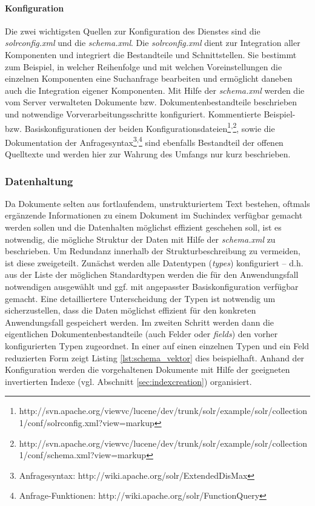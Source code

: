 \paragraph{Konfiguration} Die zwei wichtigsten Quellen zur Konfiguration des Dienstes sind die \textit{solrconfig.xml} und die \textit{schema.xml}. Die \textit{solrconfig.xml} dient zur Integration aller Komponenten und integriert die Bestandteile und Schnittstellen. Sie bestimmt zum Beispiel, in welcher Reihenfolge und mit welchen Voreinstellungen die einzelnen Komponenten eine Suchanfrage bearbeiten und ermöglicht daneben auch die Integration eigener Komponenten. Mit Hilfe der  \textit{schema.xml} werden die vom Server verwalteten Dokumente bzw. Dokumentenbestandteile beschrieben und notwendige Vorverarbeitungsschritte konfiguriert. Kommentierte Beispiel- bzw. Basiskonfigurationen der beiden Konfigurationsdateien\footnote{\tiny{http://svn.apache.org/viewvc/lucene/dev/trunk/solr/example/solr/collection1/conf/solrconfig.xml?view=markup}}\textsuperscript{,}\footnote{\tiny{http://svn.apache.org/viewvc/lucene/dev/trunk/solr/example/solr/collection1/conf/schema.xml?view=markup}}, sowie die Dokumentation der Anfragesyntax\footnote{\tiny{Anfragesyntax: http://wiki.apache.org/solr/ExtendedDisMax}}\textsuperscript{,}\footnote{\tiny{Anfrage-Funktionen: http://wiki.apache.org/solr/FunctionQuery}} sind ebenfalls Bestandteil der offenen Quelltexte und werden hier zur Wahrung des Umfangs nur kurz beschrieben.

\subsubsection{Datenhaltung}\label{sec:solrshards}

Da Dokumente selten aus fortlaufendem, unstrukturiertem Text bestehen, oftmals ergänzende Informationen zu einem Dokument im Suchindex verfügbar gemacht werden sollen und die Datenhalten möglichst effizient geschehen soll, ist es notwendig, die mögliche Struktur der Daten mit Hilfe der \textit{schema.xml} zu beschrieben. Um Redundanz innerhalb der Strukturbeschreibung zu vermeiden, ist diese zweigeteilt. Zunächst werden alle Datentypen (\textit{types}) konfiguriert -- d.h. aus der Liste der möglichen Standardtypen werden die für den Anwendungsfall notwendigen ausgewählt und ggf. mit angepasster Basiskonfiguration verfügbar gemacht. Eine detailliertere Unterscheidung der Typen ist notwendig um sicherzustellen, dass die Daten möglichst effizient für den konkreten Anwendungsfall gespeichert werden. Im zweiten Schritt werden dann die eigentlichen Dokumentenbestandteile (auch Felder oder \textit{fields}) den vorher konfigurierten Typen zugeordnet. In einer auf einen einzelnen Typen und ein Feld reduzierten Form zeigt Listing \ref{lst:schema_vektor} dies beispielhaft. Anhand der Konfiguration werden die vorgehaltenen Dokumente mit Hilfe der geeigneten invertierten Indexe (vgl. Abschnitt \ref{sec:indexcreation}) organisiert.


